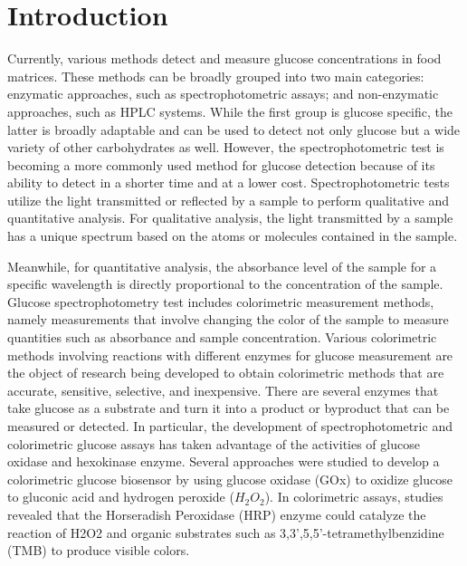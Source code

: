 \documentclass[conference]{IEEEtran}
\begin{document}
\section{Introduction}
Currently, various methods detect and measure glucose concentrations in food matrices.
These methods can be broadly grouped into two main categories: enzymatic approaches, such as spectrophotometric assays; and non-enzymatic approaches, such as HPLC systems.
While the first group is glucose specific, the latter is broadly adaptable and can be used to detect not only glucose but a wide variety of other carbohydrates as well\cite{b1}.
However, the spectrophotometric test is becoming a more commonly used method for glucose detection because of its ability to detect in a shorter time and at a lower cost.
Spectrophotometric tests utilize the light transmitted or reflected by a sample to perform qualitative and quantitative analysis.
For qualitative analysis, the light transmitted by a sample has a unique spectrum based on the atoms or molecules contained in the sample.  

Meanwhile, for quantitative analysis, the absorbance level of the sample for a specific wavelength is directly proportional to the concentration of the sample.
Glucose spectrophotometry test includes colorimetric measurement methods, namely measurements that involve changing the color of the sample to measure quantities such as absorbance and sample concentration.
Various colorimetric methods involving reactions with different enzymes for glucose measurement are the object of research being developed to obtain colorimetric methods that are accurate, sensitive, selective, and inexpensive.
There are several enzymes that take glucose as a substrate and turn it into a product or byproduct that can be measured or detected.
In particular, the development of spectrophotometric and colorimetric glucose assays has taken advantage of the activities of glucose oxidase and hexokinase enzyme\cite{b1}.
Several approaches were studied to develop a colorimetric glucose biosensor by using glucose oxidase (GOx) to oxidize glucose to gluconic acid and hydrogen peroxide ($H_2O_2$).
In colorimetric assays, studies revealed that the Horseradish Peroxidase (HRP) enzyme could catalyze the reaction of H2O2 and organic substrates such as 3,3',5,5'-tetramethylbenzidine (TMB) to produce visible colors\cite{b2}. 
\end{document}
